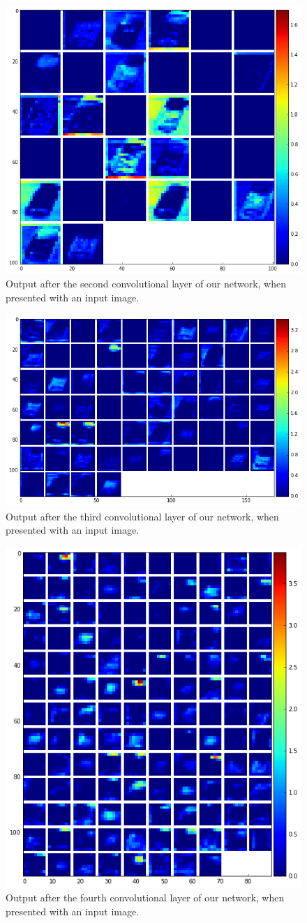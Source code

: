 \documentclass[	DIV=calc,%
				paper=a4,%
				fontsize=11pt,%
				twocolumn]{scrartcl}	 %
\begin{document}
\begin{figure}[H]
    \centering
    \includegraphics[width=0.5\linewidth]{data/final_cnn_secondlayer}
    \caption{Output after the second convolutional layer of our network, when presented with an input image.}
\end{figure}

\begin{figure}[H]
    \centering
    \includegraphics[width=0.5\linewidth]{data/final_cnn_thirdlayer}
    \caption{Output after the third convolutional layer of our network, when presented with an input image.}
\end{figure}

\begin{figure}[H]
    \centering
    \includegraphics[width=0.5\linewidth]{data/final_cnn_fourthlayer}
    \caption{Output after the fourth convolutional layer of our network, when presented with an input image.}
\end{figure}
\end{document}

